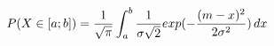 \documentclass[preview]{standalone}
\begin{document}
\begin{align*}
P( X \in [a;b] ) = { \frac{1}{\sqrt{\pi}} } \int_a^b { { \frac{1}{\sigma \sqrt{2}} } exp(-{ {(m - x)^2} \over {2 \sigma^2} }) } \, dx
\end{align*}
\end{document}

